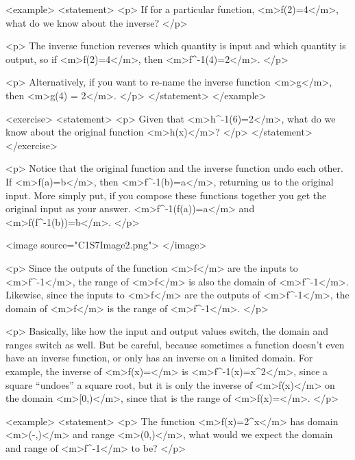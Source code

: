         <example>
            <statement>
                <p>
                    If for a particular function, <m>f(2)=4</m>, what do we know about the inverse?
                </p>

                <p>
                    The inverse function reverses which quantity is input and which quantity is output, so if <m>f(2)=4</m>, then <m>f^{-1}(4)=2</m>.
                </p>

                <p>
                    Alternatively, if you want to re-name the inverse function <m>g</m>, then <m>g(4) = 2</m>.
                </p>
            </statement>
        </example>

        <exercise>
            <statement>
                <p>
                    Given that <m>h^{-1}(6)=2</m>, what do we know about the original function <m>h(x)</m>?
                </p>
            </statement>
        </exercise>

        <p>
            Notice that the original function and the inverse function undo each other.
            If <m>f(a)=b</m>, then <m>f^{-1}(b)=a</m>, returning us to the original input.
            More simply put, if you compose these functions together you get the original input as your answer.
            <m>f^{-1}(f(a))=a</m> and <m>f(f^{-1}(b))=b</m>.
        </p>

        <image source="C1S7Image2.png">
        </image>

        <p>
            Since the outputs of the function <m>f</m> are the inputs to <m>f^{-1}</m>, the range of <m>f</m> is also the domain of <m>f^{-1}</m>.
            Likewise, since the inputs to <m>f</m> are the outputs of <m>f^{-1}</m>, the domain of <m>f</m> is the range of <m>f^{-1}</m>.
        </p>

        <p>
            Basically, like how the input and output values switch, the domain and ranges switch as well.
            But be careful, because sometimes a function doesn’t even have an inverse function, or only has an inverse on a limited domain.
            For example, the inverse of <m>f(x)=</m> is <m>f^{-1}(x)=x^{2}</m>, since a square “undoes” a square root, but it is only the inverse of <m>f(x)</m> on the domain <m>[0,\infty)</m>, since that is the range of <m>f(x)=</m>.
        </p>

        <example>
            <statement>
                <p>
                    The function <m>f(x)=2^{x}</m> has domain <m>(-\infty,\infty)</m> and range <m>(0,\infty)</m>, what would we expect the domain and range of <m>f^{-1}</m> to be?
                </p>

